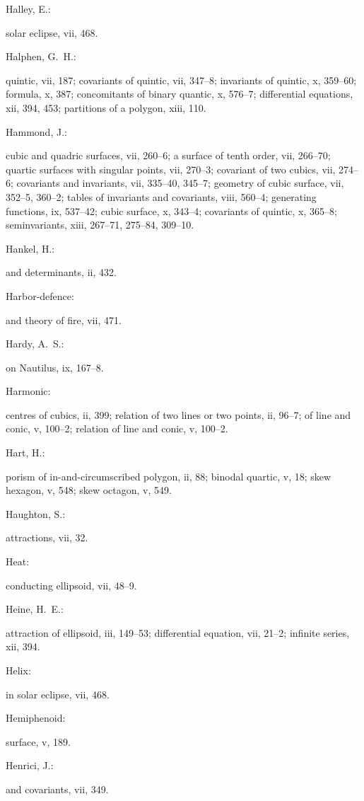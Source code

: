 \documentclass[11pt,a4paper]{book}
\providecommand{\V}[1]{#1}
\providecommand{\IndexEntry}[2]{#1\dotfill #2\par}
\begin{document}
\IndexEntry{Halley, E.}: solar eclipse, \V{vii}, 468.

\IndexEntry{Halphen, G.\ H.}: quintic, \V{vii}, 187; covariants of quintic, \V{vii}, 347--8; invariants of quintic, \V{x}, 359--60; formula, \V{x}, 387; concomitants of binary quantic, \V{x}, 576--7; differential equations, \V{xii}, 394, 453; partitions of a polygon, \V{xiii}, 110.

\IndexEntry{Hammond, J.}: cubic and quadric surfaces, \V{vii}, 260--6; a surface of tenth order, \V{vii}, 266--70; quartic surfaces with singular points, \V{vii}, 270--3; covariant of two cubics, \V{vii}, 274--6; covariants and invariants, \V{vii}, 335--40, 345--7; geometry of cubic surface, \V{vii}, 352--5, 360--2; tables of invariants and covariants, \V{viii}, 560--4; generating functions, \V{ix}, 537--42; cubic surface, \V{x}, 343--4; covariants of quintic, \V{x}, 365--8; seminvariants, \V{xiii}, 267--71, 275--84, 309--10.

\newpage

\setcounter{page}{102}

\IndexEntry{Hankel, H.}: and determinants, \V{ii}, 432.

\IndexEntry{Harbor-defence}: and theory of fire, \V{vii}, 471.

\IndexEntry{Hardy, A.\ S.}: on Nautilus, \V{ix}, 167--8.

\IndexEntry{Harmonic}: centres of cubics, \V{ii}, 399; relation of two lines or two points, \V{ii}, 96--7; of line and conic, \V{v}, 100--2; relation of line and conic, \V{v}, 100--2.

\IndexEntry{Hart, H.}: porism of in-and-circumscribed polygon, \V{ii}, 88; binodal quartic, \V{v}, 18; skew hexagon, \V{v}, 548; skew octagon, \V{v}, 549.

\IndexEntry{Haughton, S.}: attractions, \V{vii}, 32.

\IndexEntry{Heat}: conducting ellipsoid, \V{vii}, 48--9.

\IndexEntry{Heine, H.\ E.}: attraction of ellipsoid, \V{iii}, 149--53; differential equation, \V{vii}, 21--2; infinite series, \V{xii}, 394.

\IndexEntry{Helix}: in solar eclipse, \V{vii}, 468.

\IndexEntry{Hemiphenoid}: surface, \V{v}, 189.

\IndexEntry{Henrici, J.}: and covariants, \V{vii}, 349.
\end{document}

